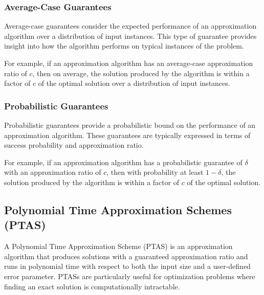 \documentclass[12pt]{book} %
\begin{document}
\subsubsection{Average-Case Guarantees}

Average-case guarantees consider the expected performance of an approximation algorithm over a distribution of input instances. This type of guarantee provides insight into how the algorithm performs on typical instances of the problem.

For example, if an approximation algorithm has an average-case approximation ratio of \(c\), then on average, the solution produced by the algorithm is within a factor of \(c\) of the optimal solution over a distribution of input instances.

\subsubsection{Probabilistic Guarantees}

Probabilistic guarantees provide a probabilistic bound on the performance of an approximation algorithm. These guarantees are typically expressed in terms of success probability and approximation ratio.

For example, if an approximation algorithm has a probabilistic guarantee of \(\delta\) with an approximation ratio of \(c\), then with probability at least \(1 - \delta\), the solution produced by the algorithm is within a factor of \(c\) of the optimal solution.

\subsection{Polynomial Time Approximation Schemes (PTAS)}

A Polynomial Time Approximation Scheme (PTAS) is an approximation algorithm that produces solutions with a guaranteed approximation ratio and runs in polynomial time with respect to both the input size and a user-defined error parameter. PTASs are particularly useful for optimization problems where finding an exact solution is computationally intractable.
\end{document}

